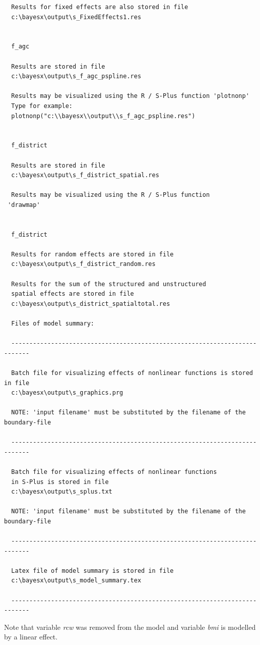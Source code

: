 \documentclass[11pt,a4paper,twoside]{bayesxreport}
\begin{document}
\begin{verbatim}
  Results for fixed effects are also stored in file
  c:\bayesx\output\s_FixedEffects1.res


  f_agc

  Results are stored in file
  c:\bayesx\output\s_f_agc_pspline.res

  Results may be visualized using the R / S-Plus function 'plotnonp'
  Type for example:
  plotnonp("c:\\bayesx\\output\\s_f_agc_pspline.res")


  f_district

  Results are stored in file
  c:\bayesx\output\s_f_district_spatial.res

  Results may be visualized using the R / S-Plus function
 'drawmap'


  f_district

  Results for random effects are stored in file
  c:\bayesx\output\s_f_district_random.res

  Results for the sum of the structured and unstructured
  spatial effects are stored in file
  c:\bayesx\output\s_district_spatialtotal.res

  Files of model summary:

  ---------------------------------------------------------------------------

  Batch file for visualizing effects of nonlinear functions is stored in file
  c:\bayesx\output\s_graphics.prg

  NOTE: 'input filename' must be substituted by the filename of the boundary-file

  ---------------------------------------------------------------------------

  Batch file for visualizing effects of nonlinear functions
  in S-Plus is stored in file
  c:\bayesx\output\s_splus.txt

  NOTE: 'input filename' must be substituted by the filename of the boundary-file

  ---------------------------------------------------------------------------

  Latex file of model summary is stored in file
  c:\bayesx\output\s_model_summary.tex

  ---------------------------------------------------------------------------
\end{verbatim}
\normalsize

Note that variable {\em rcw} was removed from the model and variable
{\em bmi} is modelled by a linear effect.
\end{document}
